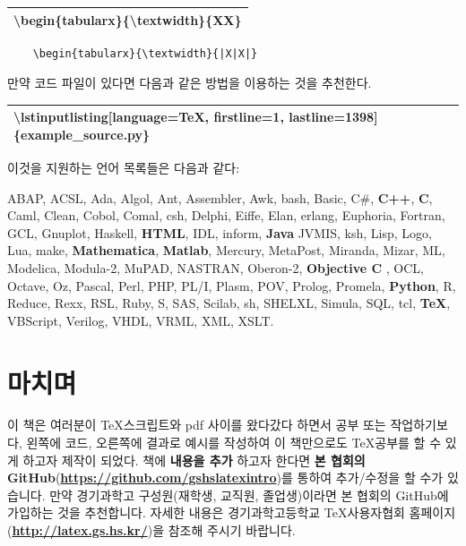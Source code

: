 \documentclass[12pt]{article}
\begin{document}
	\begin{tabularx}{\textwidth\onehalfspacing}{|X|}
		\hline
		\textbackslash begin\{tabularx\}\{\textbackslash textwidth\}\{\textbar X\textbar X\textbar\}\\
		\hline
	\end{tabularx}
	\begin{lstlisting}
	\begin{tabularx}{\textwidth}{|X|X|}
	\end{lstlisting}
	\clearpage
	만약 코드 파일이 있다면 다음과 같은 방법을 이용하는 것을 추천한다.\newline
	
	\begin{tabularx}{\textwidth\onehalfspacing}{|X|}
		\hline
		\textbackslash lstinputlisting[language=TeX, firstline=1, lastline=1398]\{example\_source.py\}\\
		\hline
	\end{tabularx}\newline\newline
	이것을 지원하는 언어 목록들은 다음과 같다:
	
		ABAP, ACSL, Ada, Algol, Ant, Assembler, Awk, bash, Basic, C\#, \textbf{C++}, \textbf{C}, Caml, Clean, Cobol, Comal, csh, Delphi, Eiffe, Elan, erlang, Euphoria, Fortran, GCL, Gnuplot, Haskell, \textbf{HTML}, IDL, inform, \textbf{Java} JVMIS, ksh, Lisp, Logo, Lua, make, \textbf{Mathematica}, \textbf{Matlab}, Mercury, MetaPost, Miranda, Mizar, ML, Modelica, Modula-2, MuPAD, NASTRAN, Oberon-2, \textbf{Objective C} , OCL, Octave, Oz, Pascal, Perl, PHP, PL/I, Plasm, POV, Prolog, Promela, \textbf{Python}, R, Reduce, Rexx, RSL, Ruby, S, SAS, Scilab, sh, SHELXL, Simula, SQL, tcl, \textbf{TeX}, VBScript, Verilog, VHDL, VRML, XML, XSLT.
		
	\section{마치며}
	이 책은 여러분이 \TeX 스크립트와 pdf 사이를 왔다갔다 하면서 공부 또는 작업하기보다, 왼쪽에 코드, 오른쪽에 결과로 예시를 작성하여 이 책만으로도 \TeX 공부를 할 수 있게 하고자 제작이 되었다. 책에 \textbf{내용을 추가} 하고자 한다면 \textbf{본 협회의 GitHub}(\textbf{\url{https://github.com/gshslatexintro}})를 통하여 추가/수정을 할 수가 있습니다. 만약 경기과학고 구성원(재학생, 교직원, 졸업생)이라면 본 협회의 GitHub에 가입하는 것을 추천합니다.\newline
	자세한 내용은 경기과학고등학교 \TeX 사용자협회 홈페이지(\textbf{\url{http://latex.gs.hs.kr/}})을 참조해 주시기 바랍니다.
\end{document}
